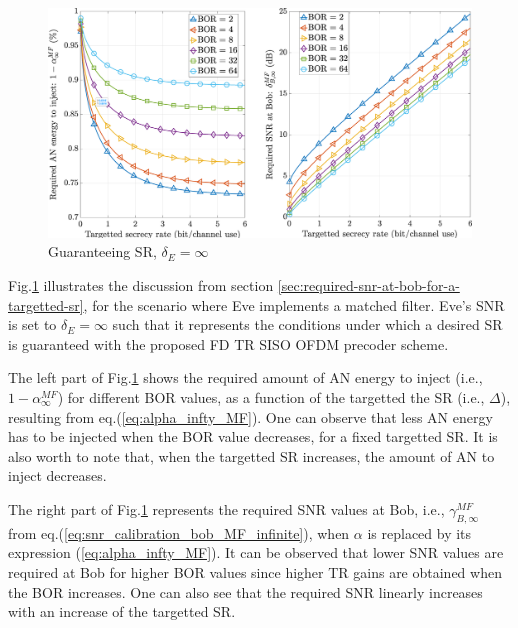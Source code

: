 \documentclass[journal,comsoc]{IEEEtran}
\let\MYoriglatexcaption\caption
\renewcommand{\caption}[2][\relax]{\MYoriglatexcaption[#2]{#2}}
\begin{document}
\begin{figure}[h!t]
	\centering
	\captionsetup{justification=centering}
	\includegraphics[width=1\linewidth]{graphs/SR_guarantee.eps}
	\caption{Guaranteeing SR, $\delta_E = \infty$}
	\label{fig_targettedSR}
\end{figure} 
Fig.\ref{fig_targettedSR} illustrates the discussion from section \ref{sec:required-snr-at-bob-for-a-targetted-sr}, for the scenario where Eve implements a matched filter. Eve's SNR is set to $\delta_E = \infty$ such that it represents the conditions under which a desired SR is guaranteed with the proposed FD TR SISO OFDM precoder scheme.

The left part of Fig.\ref{fig_targettedSR} shows the required amount of AN energy to inject (i.e., $1-\alpha_{\infty}^{MF}$) for different BOR values, as a function of the targetted the SR (i.e., $\Delta$), resulting from eq.(\ref{eq:alpha_infty_MF}). One can observe that less AN energy has to be injected when the BOR value decreases, for a fixed targetted SR. It is also worth to note that, when the targetted SR increases, the amount of AN to inject decreases. 

The right part of Fig.\ref{fig_targettedSR} represents the required SNR values at Bob, i.e., $\gamma_{B,\infty}^{MF}$ from eq.(\ref{eq:snr_calibration_bob_MF_infinite}), when $\alpha$ is replaced by its expression (\ref{eq:alpha_infty_MF}). It can be observed that lower SNR values are required at Bob for higher BOR values since higher TR gains are obtained when the BOR increases. One can also see that the required SNR linearly increases with an increase of the targetted SR. 
\end{document}
